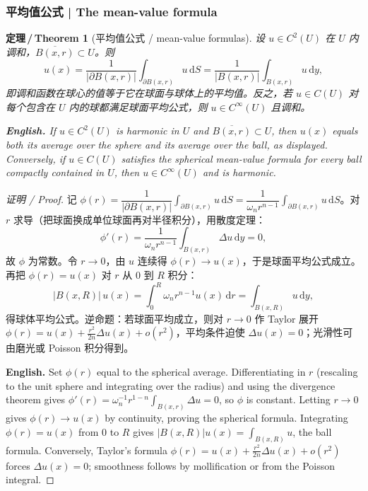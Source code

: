 \documentclass[UTF8,11pt,a4paper]{ctexart}
\newcommand{\EN}[1]{\par\noindent \textbf{English.} #1\par}
\newtheorem{theorem}[definition]{定理\,/\,Theorem}
\newcommand{\dd}{\mathrm{d}}
\begin{document}
\subsubsection{平均值公式 | The mean-value formula}
\begin{theorem}[平均值公式 / mean-value formulas]\label{thm:mvp}
设 $u\in C^2(U)$ 在 $U$ 内调和，$\overline{B(x,r)}\subset U$。则
\[
u(x)=\frac{1}{|\partial B(x,r)|}\int_{\partial B(x,r)}u\,\dd S=\frac{1}{|B(x,r)|}\int_{B(x,r)}u\,\dd y,
\]
即调和函数在球心的值等于它在球面与球体上的平均值。反之，若 $u\in C(U)$ 对每个包含在 $U$ 内的球都满足球面平均公式，则 $u\in C^\infty(U)$ 且调和。
\EN{If $u\in C^2(U)$ is harmonic in $U$ and $\overline{B(x,r)}\subset U$, then $u(x)$ equals both its average over the sphere and its average over the ball, as displayed. Conversely, if $u\in C(U)$ satisfies the spherical mean-value formula for every ball compactly contained in $U$, then $u\in C^\infty(U)$ and is harmonic.}
\end{theorem}

\begin{proof}[证明 / Proof]
记 $\phi(r)=\dfrac{1}{|\partial B(x,r)|}\displaystyle\int_{\partial B(x,r)}u\,\dd S=\dfrac{1}{\omega_n r^{n-1}}\int_{\partial B(x,r)}u\,\dd S$。对 $r$ 求导（把球面换成单位球面再对半径积分），用散度定理：
\[
\phi'(r)=\frac{1}{\omega_n r^{n-1}}\int_{B(x,r)}\Delta u\,\dd y=0,
\]
故 $\phi$ 为常数。令 $r\to0$，由 $u$ 连续得 $\phi(r)\to u(x)$，于是球面平均公式成立。再把 $\phi(r)=u(x)$ 对 $r$ 从 $0$ 到 $R$ 积分：
\[
|B(x,R)|\,u(x)=\int_0^R\omega_n r^{n-1}u(x)\,\dd r=\int_{B(x,R)}u\,\dd y,
\]
得球体平均公式。逆命题：若球面平均成立，则对 $r\to0$ 作 Taylor 展开 $\phi(r)=u(x)+\frac{r^2}{2n}\Delta u(x)+o(r^2)$，平均条件迫使 $\Delta u(x)=0$；光滑性可由磨光或 Poisson 积分得到。\EN{Set $\phi(r)$ equal to the spherical average. Differentiating in $r$ (rescaling to the unit sphere and integrating over the radius) and using the divergence theorem gives $\phi'(r)=\omega_n^{-1}r^{1-n}\int_{B(x,r)}\Delta u=0$, so $\phi$ is constant. Letting $r\to0$ gives $\phi(r)\to u(x)$ by continuity, proving the spherical formula. Integrating $\phi(r)=u(x)$ from $0$ to $R$ gives $|B(x,R)|u(x)=\int_{B(x,R)}u$, the ball formula. Conversely, Taylor's formula $\phi(r)=u(x)+\frac{r^2}{2n}\Delta u(x)+o(r^2)$ forces $\Delta u(x)=0$; smoothness follows by mollification or from the Poisson integral.}
\end{proof}
\end{document}
